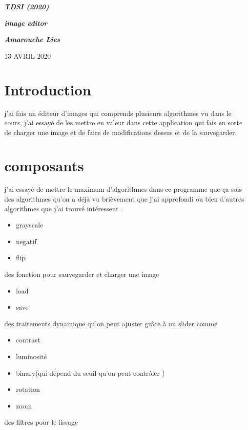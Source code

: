 \documentclass[a4paper , 10pt]{article}
\begin{document}
\begin{center}
\begin{huge}
\textit{\textbf{TDSI (2020)}}
\end{huge}
\end{center}
\begin{center}
\begin{LARGE}
\textit{\textbf{image editor}}
\end{LARGE}
\end{center}
\textit{}
\textit{}
\begin{center}
\begin{flushleft}
\begin{Large}
\textbf{\textit{Amarouche Lies}}
\end{Large}
\end{flushleft}
\end{center}
\begin{center}
13 AVRIL 2020
\end{center}
\section{Introduction}
	j'ai fais un éditeur d'images qui comprends plusieurs algorithmes vu dans le cours, j'ai essayé de les mettre en valeur dans cette application qui fais en sorte de charger une image et de faire de modifications dessus et de la sauvegarder.
\section{composants}
 j'ai essayé de mettre le maximum d'algorithmes dans ce programme que ça sois des algorithmes qu'on a déjà vu brièvement que j'ai approfondi ou bien d'autres algorithmes que j'ai trouvé intéressent .

\begin{itemize}
\item grayscale
\item negatif
\item flip
\end{itemize}
des fonction pour sauvegarder  et charger une image
\begin{itemize}
\item load
\item save
\end{itemize}
des traitements dynamique qu'on peut ajuster grâce à un slider comme
\begin{itemize}
\item contrast
\item luminosité 
\item binary(qui dépend du seuil qu'on peut contrôler )
\item rotation
\item zoom
\end{itemize}
des filtres pour le lissage 
 
\end{document}
